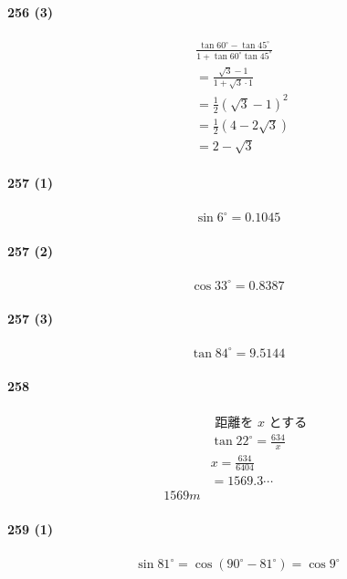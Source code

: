 \documentclass[fleqn,a4j,dvipdfmx,uplatex,twocolumn]{jsarticle}
\begin{document}
\paragraph{256 (3)}
\begin{align*}
&\frac{\tan 60^{\circ}-\tan 45^{\circ}}{1+\tan 60^{\circ} \tan 45^{\circ}} \\
& =\frac{\sqrt{3}-1}{1+\sqrt{3} \cdot 1} \\
& =\frac{1}{2}(\sqrt{3}-1)^2 \\
& =\frac{1}{2}(4-2 \sqrt{3}) \\
& =2-\sqrt{3}
\end{align*}

\paragraph{257 (1)}
\begin{align*}
\sin 6^{\circ}=0.1045
\end{align*}

\paragraph{257 (2)}
\begin{align*}
\cos 33^{\circ}=0.8387
\end{align*}

\paragraph{257 (3)}
\begin{align*}
\tan 84^{\circ}=9.5144
\end{align*}

\paragraph{258}
\begin{align*}
& \text { 距離を } x\text { とする } \\
& \tan 22^{\circ}=\frac{634}{x} \\
& x=\frac{634}{6404} \\
& =1569.3 \cdots \\
1569 m
\end{align*}

\paragraph{259 (1)}
\begin{align*}
\sin 81^{\circ}=\cos \left(90^{\circ}-81^{\circ}\right)
=\cos 9^{\circ}
\end{align*}
\end{document}
